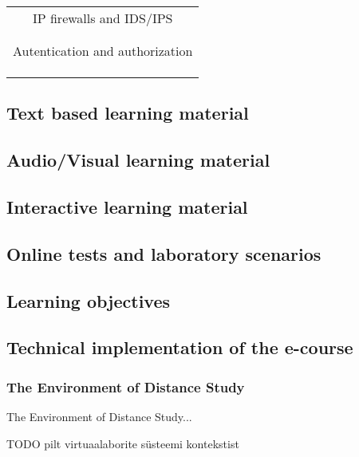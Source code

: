 \begin{table}[h]
\begin{tabular}{|p{5cm}|p{3cm}|p{6cm}|}
\hline
 & & \\

\hline
\hline
  \multicolumn{3}{|c|}{IP firewalls and IDS/IPS} \\
\hline 
 & & \\
\hline

\hline
 & & \\

\hline
\hline
  \multicolumn{3}{|c|}{Autentication and authorization} \\
\hline 
 & & \\
\hline

\hline
 & & \\

\hline
 & & \\
\hline
\end{tabular} 
\label{table:learning_materials}
\end{table}


\subsection{Text based learning material}
\subsection{Audio/Visual learning material}
\subsection{Interactive learning material}
\subsection{Online tests and laboratory scenarios}
\subsection{Learning objectives}
\subsection{Technical implementation of the e-course}

\subsubsection{The Environment of Distance Study}
\label{The Environment of Distance Study}
The Environment of Distance Study...

TODO pilt virtuaalaborite süsteemi kontekstist
